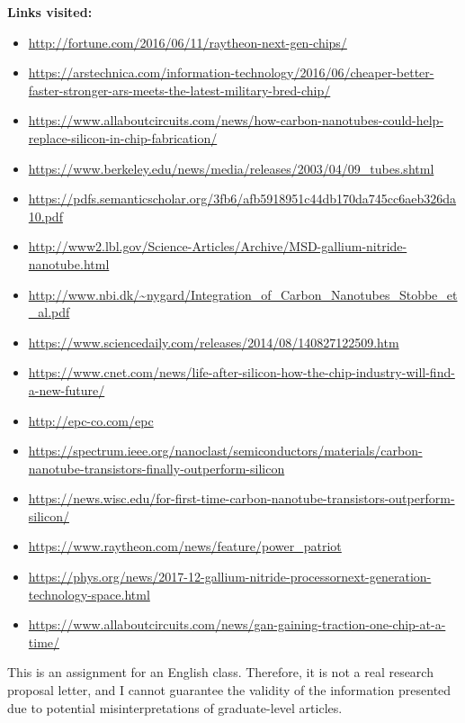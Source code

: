 \documentclass[letterpaper]{letter}
\begin{document}
\textbf{Links visited:}
\begin{itemize}
  \item \url{http://fortune.com/2016/06/11/raytheon-next-gen-chips/}
  \item \url{https://arstechnica.com/information-technology/2016/06/cheaper-better-faster-stronger-ars-meets-the-latest-military-bred-chip/}
  \item \url{https://www.allaboutcircuits.com/news/how-carbon-nanotubes-could-help-replace-silicon-in-chip-fabrication/}
  \item \url{https://www.berkeley.edu/news/media/releases/2003/04/09_tubes.shtml}
  \item \url{https://pdfs.semanticscholar.org/3fb6/afb5918951c44db170da745cc6aeb326da10.pdf}
  \item \url{http://www2.lbl.gov/Science-Articles/Archive/MSD-gallium-nitride-nanotube.html}
  \item \url{http://www.nbi.dk/~nygard/Integration_of_Carbon_Nanotubes_Stobbe_et_al.pdf}
  \item \url{https://www.sciencedaily.com/releases/2014/08/140827122509.htm}
  \item \url{https://www.cnet.com/news/life-after-silicon-how-the-chip-industry-will-find-a-new-future/}
  \item \url{http://epc-co.com/epc}
  \item \url{https://spectrum.ieee.org/nanoclast/semiconductors/materials/carbon-nanotube-transistors-finally-outperform-silicon}
  \item \url{https://news.wisc.edu/for-first-time-carbon-nanotube-transistors-outperform-silicon/}
  \item \url{https://www.raytheon.com/news/feature/power_patriot}
  \item \url{https://phys.org/news/2017-12-gallium-nitride-processornext-generation-technology-space.html}
  \item \url{https://www.allaboutcircuits.com/news/gan-gaining-traction-one-chip-at-a-time/}
\end{itemize}
\vspace*{\fill}
This is an assignment for an English class. Therefore, it is not a real research proposal letter, and I cannot
guarantee the validity of the information presented due to potential misinterpretations of graduate-level articles.
\end{document}
